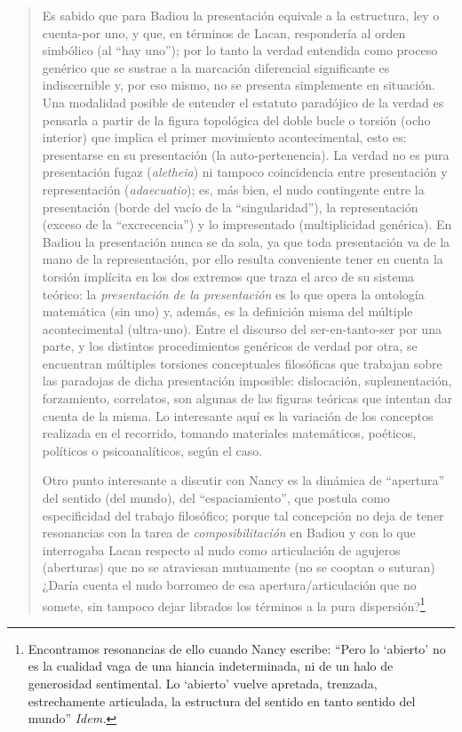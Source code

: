 \begin{quote}
Es sabido que para Badiou la presentación equivale a la estructura, ley o cuenta-por uno, y que, en términos de Lacan, respondería al orden simbólico (al \enquote{hay uno}); por lo tanto la verdad entendida como proceso genérico que se sustrae a la marcación diferencial significante es indiscernible y, por eso mismo, no se presenta simplemente en situación. Una modalidad posible de entender el estatuto paradójico de la verdad es pensarla a partir de la figura topológica del doble bucle o torsión (ocho interior) que implica el primer movimiento acontecimental, esto es: presentarse en su presentación (la auto-pertenencia). La verdad no es pura presentación fugaz (\emph{aletheia}) ni tampoco coincidencia entre presentación y representación (\emph{adaecuatio}); es, más bien, el nudo contingente  entre la presentación (borde del vacío de la \enquote{singularidad}), la representación (exceso de la \enquote{excrecencia}) y lo impresentado (multiplicidad genérica). En Badiou la presentación nunca se da sola, ya que toda presentación va de la mano de la representación, por ello resulta conveniente tener en cuenta la torsión implícita en los dos extremos que traza el arco de su sistema teórico: la \emph{presentación de la presentación} es lo que opera la ontología matemática (sin uno) y, además, es la definición misma del múltiple acontecimental (ultra-uno). Entre el discurso del ser-en-tanto-ser por una parte, y los distintos procedimientos genéricos de verdad por otra, se encuentran múltiples torsiones conceptuales filosóficas que trabajan sobre las paradojas de dicha presentación imposible: dislocación, suplementación, forzamiento, correlatos, son algunas de las figuras teóricas que intentan dar cuenta de la misma. Lo interesante aquí es la variación de los conceptos realizada en el recorrido, tomando materiales matemáticos, poéticos, políticos o psicoanalíticos, según el caso.

Otro punto interesante a discutir con Nancy es la dinámica de \enquote{apertura} del sentido (del mundo), del \enquote{espaciamiento}, que postula como especificidad del trabajo filosófico; porque tal concepción no deja de tener resonancias con la tarea de \emph{composibilitación} en Badiou y con lo que interrogaba Lacan respecto al nudo como articulación de agujeros (aberturas) que no se atraviesan mutuamente (no se cooptan o suturan) ¿Daría cuenta el nudo borromeo de esa apertura/articulación que no somete, sin tampoco dejar librados los términos a la pura dispersión?\footnote{Encontramos resonancias de ello cuando Nancy escribe: \enquote{Pero lo \enquote{abierto} no es la cualidad vaga de una hiancia indeterminada, ni de un halo de generosidad sentimental. Lo \enquote{abierto} vuelve apretada, trenzada, estrechamente articulada, la estructura del sentido en tanto sentido del mundo} \emph{Idem.}}


\end{quote}
